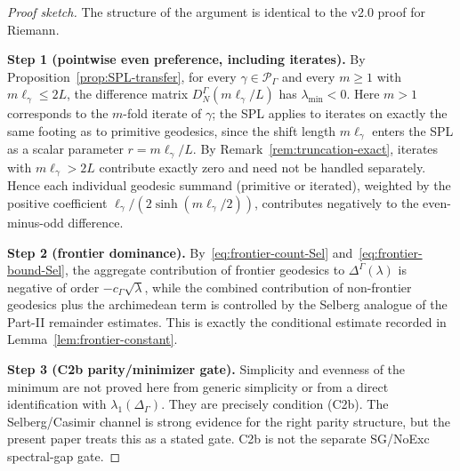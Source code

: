 \documentclass[12pt,a4paper]{article}
\theoremstyle{definition}
\theoremstyle{remark}
\newcommand{\Delop}{\Delta_{\Gamma}}
\begin{document}
\begin{proof}[Proof sketch]
The structure of the argument is identical to the v2.0 proof for Riemann.

\smallskip\noindent
\textbf{Step 1 (pointwise even preference, including iterates).} By
Proposition~\ref{prop:SPL-transfer}, for every $\gamma \in \mathcal{P}_\Gamma$
and every $m \ge 1$ with $m\ell_\gamma \le 2L$, the difference matrix
$D^\Gamma_N(m\ell_\gamma / L)$ has $\lambda_{\min} < 0$.  Here $m > 1$
corresponds to the $m$-fold iterate of $\gamma$; the SPL applies to iterates
on exactly the same footing as to primitive geodesics, since the shift length
$m\ell_\gamma$ enters the SPL as a scalar parameter $r = m\ell_\gamma/L$.
By Remark~\ref{rem:truncation-exact}, iterates with $m\ell_\gamma > 2L$
contribute exactly zero and need not be handled separately.  Hence each individual
geodesic summand (primitive or iterated), weighted by the positive coefficient
$\ell_\gamma/(2\sinh(m\ell_\gamma/2))$, contributes negatively to the
even-minus-odd difference.

\smallskip\noindent
\textbf{Step 2 (frontier dominance).} By~\eqref{eq:frontier-count-Sel} and~\eqref{eq:frontier-bound-Sel}, the aggregate contribution of frontier geodesics
to $\Delta^\Gamma(\lambda)$ is negative of order $-c_\Gamma \sqrt{\lambda}$,
while the combined contribution of non-frontier geodesics plus the archimedean
term is controlled by the Selberg analogue of the Part-II remainder estimates.
This is exactly the conditional estimate recorded in
Lemma~\ref{lem:frontier-constant}.

\smallskip\noindent
\textbf{Step 3 (C2b parity/minimizer gate).} Simplicity and evenness of the minimum are not
proved here from generic simplicity or from a direct identification with
$\lambda_1(\Delop)$.  They are precisely condition (C2b).  The Selberg/Casimir
channel is strong evidence for the right parity structure, but the present
paper treats this as a stated gate.  C2b is not the separate SG/NoExc
spectral-gap gate.


\end{proof}
\end{document}
